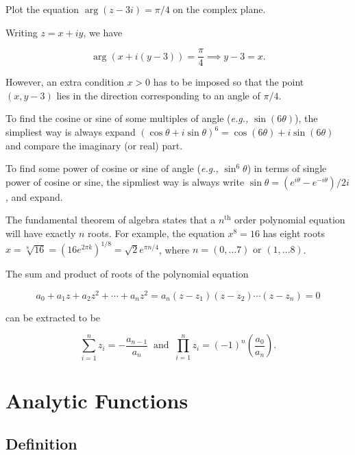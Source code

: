 \documentclass[english,a4paper,12pt]{report}
\begin{document}
{Plot the equation \(\arg (z-3i) = \pi /4\) on the complex plane. }
{Writing \(z = x+iy\), we have

\begin{equation}
    \arg \left( x+i(y-3) \right) =\frac{\pi }{4} \implies y - 3 = x. 
\end{equation}

However, an extra condition \(x > 0\) has to be imposed so that the point \((x,y-3)\) lies in the direction corresponding to an angle of \(\pi /4\).  

} 

To find the cosine or sine of some multiples of angle (\textit{e.g.,} \(\sin (6\theta )\)), the simpliest way is always expand \((\cos \theta +i\sin \theta )^6 = \cos (6\theta ) + i\sin (6\theta )\) and compare the imaginary (or real) part. 

To find some power of cosine or sine of angle (\textit{e.g.,} \(\sin ^{6} \theta \)) in terms of single power of cosine or sine, the sipmliest way is always write \(\sin \theta = (e^{i \theta }-e^{-i \theta })/2i \), and expand. 

The fundamental theorem of algebra states that a \(n^{\text{th}}\) order polynomial equation will have exactly \(n\) roots. For example, the equation \(x^{8} = 16\) has eight roots \(x = \sqrt[8]{16} = (16e^{2\pi k})^{1 /8 } = \sqrt{2}e^{\pi n/4 }\), where \(n = (0,\ldots 7) \text { or } (1,\ldots 8)\).   

The sum and product of roots of the polynomial equation

\begin{equation}
    a_0 + a_1 z + a_2 z ^2 + \cdots + a_{n}z^2 = a_{n}(z - z_1 )(z-z_2 )\cdots (z-z_{n} ) = 0   
\end{equation}

can be extracted to be 

\begin{equation}
    \sum_{i=1}^{n} z_{i} = - \frac{a_{n-1} }{a_{n} } ~\text { and }~ \prod_{i=1}^{n} z_{i} = (-1)^{n} \left(\frac{a_{0} }{a_{n} }\right).     
\end{equation}

\section{Analytic Functions}

\subsection{Definition}
\end{document}
